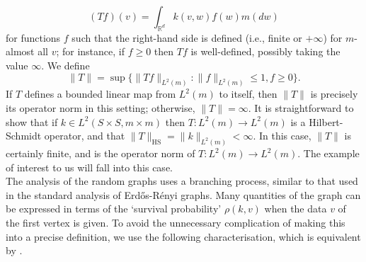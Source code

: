 \documentclass[11pt, notitlepage]{article}
\begin{document}
\begin{equation}\label{eq: T}
       (T f)(v)=\int_{\mathbb{R}^d} k(v,w)f(w)m(dw) 
   \end{equation} for functions $f$ such that the right-hand side is defined (i.e., finite or $+\infty$) for $m$-almost all $v$; for instance, if $f\ge 0$ then $Tf$ is well-defined, possibly taking the value $\infty$. We define \begin{equation} \|T\|=\sup\{\|Tf\|_{L^2(m)}: \|f\|_{L^2(m)}\le 1, f\ge 0\}. \end{equation} If $T$ defines a bounded linear map from $L^2(m)$ to itself, then $\|T\|$ is precisely its operator norm in this setting; otherwise, $\|T\|=\infty.$ It is straightforward to show that if $k\in L^2(S\times S, m\times m)$ then $T: L^2(m)\rightarrow L^2(m)$ is a Hilbert-Schmidt operator, and that $\|T\|_\text{HS}=\|k\|_{L^2(m)}<\infty$. In this case, $\|T\|$ is certainly finite, and is the operator norm of $T: L^2(m)\rightarrow L^2(m)$. The example of interest to us will fall into this case. \bigskip\\  The analysis of the random graphs uses a branching process, similar to that used in the standard analysis of Erd\H{o}s-R\'enyi graphs. Many quantities of the graph can be expressed in terms of the `survival probability' $\rho(k, v)$ when the data $v$ of the first vertex is given. To avoid the unnecessary complication of making this into a precise definition, we use the following characterisation, which is equivalent by \cite[Theorem 6.2]{BJR07}.
\end{document}
